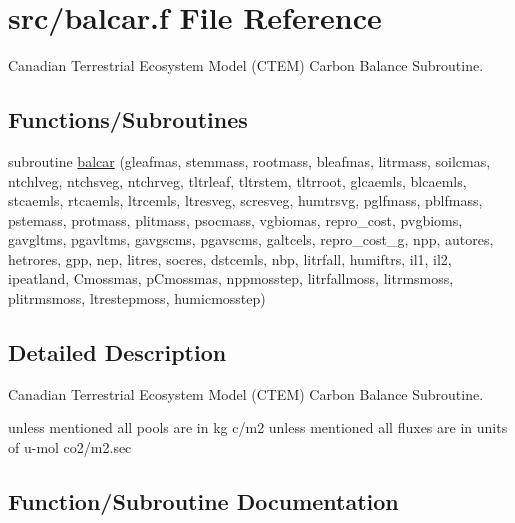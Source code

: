 \hypertarget{balcar_8f}{}\section{src/balcar.f File Reference}
\label{balcar_8f}


Canadian Terrestrial Ecosystem Model (C\+T\+E\+M) Carbon Balance Subroutine.  


\subsection*{Functions/\+Subroutines}
\begin{DoxyCompactItemize}
\item 
subroutine \hyperlink{balcar_8f_a922db81c881d66b3cf76a5a72ea4586a}{balcar} (gleafmas, stemmass, rootmass, bleafmas, litrmass, soilcmas, ntchlveg, ntchsveg, ntchrveg, tltrleaf, tltrstem, tltrroot, glcaemls, blcaemls, stcaemls, rtcaemls, ltrcemls, ltresveg, scresveg, humtrsvg, pglfmass, pblfmass, pstemass, protmass, plitmass, psocmass, vgbiomas, repro\+\_\+cost, pvgbioms, gavgltms, pgavltms, gavgscms, pgavscms, galtcels, repro\+\_\+cost\+\_\+g, npp, autores, hetrores, gpp, nep, litres, socres, dstcemls, nbp, litrfall, humiftrs, il1, il2, ipeatland, Cmossmas, p\+Cmossmas, nppmosstep, litrfallmoss, litrmsmoss, plitrmsmoss, ltrestepmoss, humicmosstep)
\end{DoxyCompactItemize}


\subsection{Detailed Description}
Canadian Terrestrial Ecosystem Model (C\+T\+E\+M) Carbon Balance Subroutine. 

unless mentioned all pools are in kg c/m2 unless mentioned all fluxes are in units of u-\/mol co2/m2.\+sec 

\subsection{Function/\+Subroutine Documentation}
\hypertarget{balcar_8f_a922db81c881d66b3cf76a5a72ea4586a}{}
